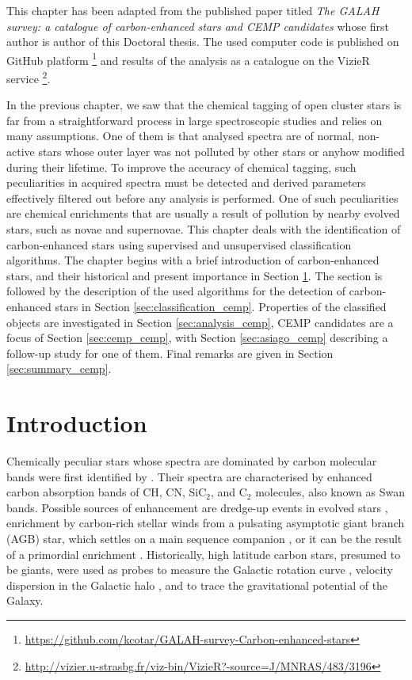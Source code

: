 This chapter has been adapted from the published paper titled \textit{The GALAH survey: a catalogue of carbon-enhanced stars and CEMP candidates} \cite{2019MNRAS.483.3196C} whose first author is author of this Doctoral thesis. The used computer code is published on GitHub platform  \footnote{\url{https://github.com/kcotar/GALAH-survey-Carbon-enhanced-stars}} and results of the analysis as a catalogue on the VizieR service  \footnote{\url{http://vizier.u-strasbg.fr/viz-bin/VizieR?-source=J/MNRAS/483/3196}}.

In the previous chapter, we saw that the chemical tagging of open cluster stars is far from a straightforward process in large spectroscopic studies and relies on many assumptions. One of them is that analysed spectra are of normal, non-active stars whose outer layer was not polluted by other stars or anyhow modified during their lifetime. To improve the accuracy of chemical tagging, such peculiarities in acquired spectra must be detected and derived parameters effectively filtered out before any analysis is performed. One of such peculiarities are chemical enrichments that are usually a result of pollution by nearby evolved stars, such as novae and supernovae. This chapter deals with the identification of carbon-enhanced stars using supervised and unsupervised classification algorithms. The chapter begins with a brief introduction of carbon-enhanced stars, and their historical and present importance in Section \ref{sec:intro_cemp}. The section is followed by the description of the used algorithms for the detection of carbon-enhanced stars in Section \ref{sec:classification_cemp}. Properties of the classified objects are investigated in Section \ref{sec:analysis_cemp}, CEMP candidates are a focus of Section \ref{sec:cemp_cemp}, with Section \ref{sec:asiago_cemp} describing a follow-up study for one of them. Final remarks are given in Section \ref{sec:summary_cemp}.

\section{Introduction}
\label{sec:intro_cemp}
Chemically peculiar stars whose spectra are dominated by carbon molecular bands were first identified by \citet{1869AN.....73..129S}. Their spectra are characterised by enhanced carbon absorption bands of CH, CN, SiC$_2$, and C$_{2}$ molecules, also known as Swan bands. Possible sources of enhancement are dredge-up events in evolved stars \cite{1983ApJ...275L..65I}, enrichment by carbon-rich stellar winds from a pulsating asymptotic giant branch (AGB) star, which settles on a main sequence companion \cite{1995MNRAS.277.1443H}, or it can be the result of a primordial enrichment \cite{2016ApJ...833...20Y}. Historically, high latitude carbon stars, presumed to be giants, were used as probes to measure the Galactic rotation curve \cite{2013Ap.....56...68B}, velocity dispersion in the Galactic halo \cite{1991AJ....101.2220B}, and to trace the gravitational potential of the Galaxy.  

